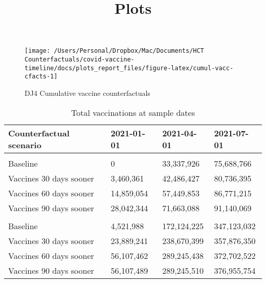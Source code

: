 \documentclass[
  12pt,
]{article}
\title{Plots}
\author{}
\date{\vspace{-2.5em}}
\begin{document}
\maketitle

\begin{figure}

{\centering \texttt{[image: /Users/Personal/Dropbox/Mac/Documents/HCT Counterfactuals/covid-vaccine-timeline/docs/plots\_report\_files/figure-latex/cumul-vacc-cfacts-1]} 

}

\caption{DJ4 Cumulative vaccine counterfactuals}\label{fig:cumul-vacc-cfacts}
\end{figure}
\begin{table}

\caption{\label{tab:vaccinations-table}Total vaccinations at sample dates}
\centering
\begin{tabular}[t]{llll}
\toprule
Counterfactual scenario & 2021-01-01 & 2021-04-01 & 2021-07-01\\
\midrule
\addlinespace[0.3em]
\multicolumn{4}{l}{\textbf{United Kingdom}}\\
\hspace{1em}Baseline & 0 & 33,337,926 & 75,688,766\\
\hspace{1em}Vaccines 30 days sooner & 3,460,361 & 42,486,427 & 80,736,395\\
\hspace{1em}Vaccines 60 days sooner & 14,859,054 & 57,449,853 & 86,771,215\\
\hspace{1em}Vaccines 90 days sooner & 28,042,344 & 71,663,088 & 91,140,069\\
\addlinespace[0.3em]
\multicolumn{4}{l}{\textbf{United States}}\\
\hspace{1em}Baseline & 4,521,988 & 172,124,225 & 347,123,032\\
\hspace{1em}Vaccines 30 days sooner & 23,889,241 & 238,670,399 & 357,876,350\\
\hspace{1em}Vaccines 60 days sooner & 56,107,462 & 289,245,438 & 372,702,522\\
\hspace{1em}Vaccines 90 days sooner & 56,107,489 & 289,245,510 & 376,955,754\\
\bottomrule
\end{tabular}
\end{table}
\end{document}

